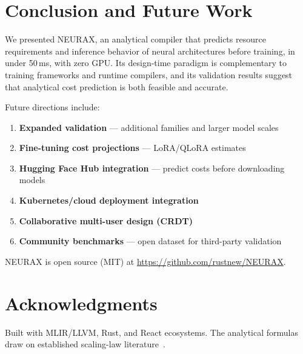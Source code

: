 \documentclass[11pt]{article}
\begin{document}
\section{Conclusion and Future Work}

We presented NEURAX, an analytical compiler that predicts resource requirements and inference behavior of neural architectures before training, in under 50\,ms, with zero GPU. Its design-time paradigm is complementary to training frameworks and runtime compilers, and its validation results suggest that analytical cost prediction is both feasible and accurate.

Future directions include:
\begin{enumerate}
  \item \textbf{Expanded validation} --- additional families and larger model scales
  \item \textbf{Fine-tuning cost projections} --- LoRA/QLoRA estimates
  \item \textbf{Hugging Face Hub integration} --- predict costs before downloading models
  \item \textbf{Kubernetes/cloud deployment integration}
  \item \textbf{Collaborative multi-user design (CRDT)}
  \item \textbf{Community benchmarks} --- open dataset for third-party validation
\end{enumerate}
NEURAX is open source (MIT) at \url{https://github.com/rustnew/NEURAX}.

\section*{Acknowledgments}
Built with MLIR/LLVM, Rust, and React ecosystems. The analytical formulas draw on established scaling-law literature~\cite{kaplan2020scaling,hoffmann2022training}.
\end{document}
